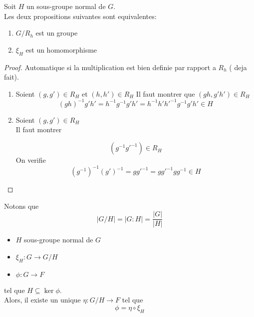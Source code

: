 \documentclass[../main.tex]{subfiles}
\begin{document}
\begin{thm}
	Soit $H$ un sous-groupe normal de $G$.\\
Les deux propositions suivantes sont equivalentes:
\begin{enumerate}
\item $G / R_h$ est un groupe
\item $\xi_H$ est un homomorphisme
\end{enumerate}
\end{thm}
\begin{proof}
	Automatique si la multiplication est bien definie par rapport a $R_h$ ( deja fait).\\
\begin{enumerate}
\item Soient $( g,g') \in R_H$ et $( h,h') \in R_H$ 
	Il faut montrer que $( gh,g'h')\in R_H$ 
	\[ 
		( gh) ^{-1}g'h' = h^{-1}g^{-1}g'h' = h^{-1}h' h'^{-1}g^{-1}g'h' \in H
	\]
\item Soient $( g,g') \in R_H$ \\
	Il faut montrer

	\[ 
	( g^{-1} g'^{-1} ) \in R_H
	\]
	On verifie
	\[ 
		( g^{-1} )^{-1}( g') ^{-1}= g g'^{-1}= g g'^{-1}g g^{-1} \in H
	\]
	
	
	 

\end{enumerate}
	
\end{proof}
\begin{rmq}
Notons que
\[ 
|G / H| = |G:H| = \frac{|G|}{|H|}
\]

\end{rmq}
\begin{thm}
\begin{itemize}
\item $H$ sous-groupe normal de $G$ 
\item $\xi_H: G \to G /H$ 
\item $\phi: G \to F$
\end{itemize}
tel que $H \subseteq \ker \phi$.\\
Alors, il existe un unique $\eta: G / H \to F$ tel que
\[ 
\phi = \eta \circ \xi_H
\]
\end{thm}
\end{document}
